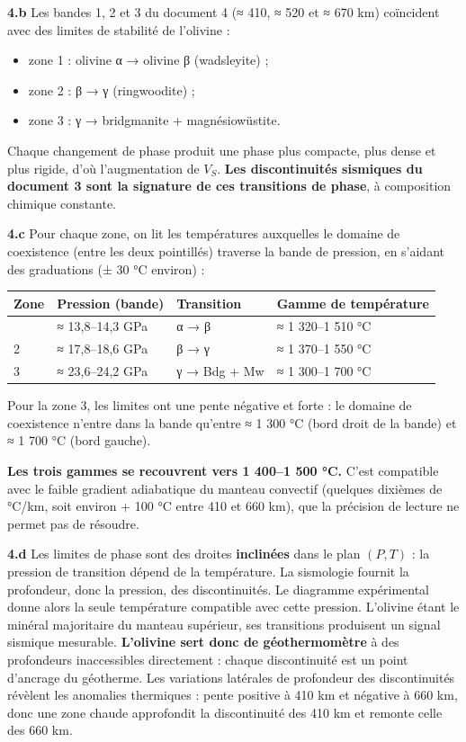 \documentclass[11pt,a4paper]{article}
\providecommand{\tightlist}{\setlength{\itemsep}{0pt}\setlength{\parskip}{0pt}}
\begin{document}
\textbf{4.b} Les bandes 1, 2 et 3 du document 4 (≈ 410, ≈ 520 et ≈ 670 km) coïncident avec des limites de stabilité de l'olivine :

\begin{itemize}
\tightlist
\item
  zone 1 : olivine α → olivine β (wadsleyite) ;
\item
  zone 2 : β → γ (ringwoodite) ;
\item
  zone 3 : γ → bridgmanite + magnésiowüstite.
\end{itemize}

Chaque changement de phase produit une phase plus compacte, plus dense et plus rigide, d'où l'augmentation de \(V_S\). \textbf{Les discontinuités sismiques du document 3 sont la signature de ces transitions de phase}, à composition chimique constante.

\textbf{4.c} Pour chaque zone, on lit les températures auxquelles le domaine de coexistence (entre les deux pointillés) traverse la bande de pression, en s'aidant des graduations (± 30 °C environ) :

\begin{longtable}[]{@{}llll@{}}
\toprule\noalign{}
Zone & Pression (bande) & Transition & Gamme de température \\
\midrule\noalign{}
\endhead
\bottomrule\noalign{}
\endlastfoot
1 & ≈ 13,8--14,3 GPa & α → β & ≈ 1 320--1 510 °C \\
2 & ≈ 17,8--18,6 GPa & β → γ & ≈ 1 370--1 550 °C \\
3 & ≈ 23,6--24,2 GPa & γ → Bdg + Mw & ≈ 1 300--1 700 °C \\
\end{longtable}

Pour la zone 3, les limites ont une pente négative et forte : le domaine de coexistence n'entre dans la bande qu'entre ≈ 1 300 °C (bord droit de la bande) et ≈ 1 700 °C (bord gauche).

\textbf{Les trois gammes se recouvrent vers 1 400--1 500 °C.} C'est compatible avec le faible gradient adiabatique du manteau convectif (quelques dixièmes de °C/km, soit environ + 100 °C entre 410 et 660 km), que la précision de lecture ne permet pas de résoudre.

\textbf{4.d} Les limites de phase sont des droites \textbf{inclinées} dans le plan \((P,T)\) : la pression de transition dépend de la température. La sismologie fournit la profondeur, donc la pression, des discontinuités. Le diagramme expérimental donne alors la seule température compatible avec cette pression. L'olivine étant le minéral majoritaire du manteau supérieur, ses transitions produisent un signal sismique mesurable. \textbf{L'olivine sert donc de géothermomètre} à des profondeurs inaccessibles directement : chaque discontinuité est un point d'ancrage du géotherme. Les variations latérales de profondeur des discontinuités révèlent les anomalies thermiques : pente positive à 410 km et négative à 660 km, donc une zone chaude approfondit la discontinuité des 410 km et remonte celle des 660 km.
\end{document}
